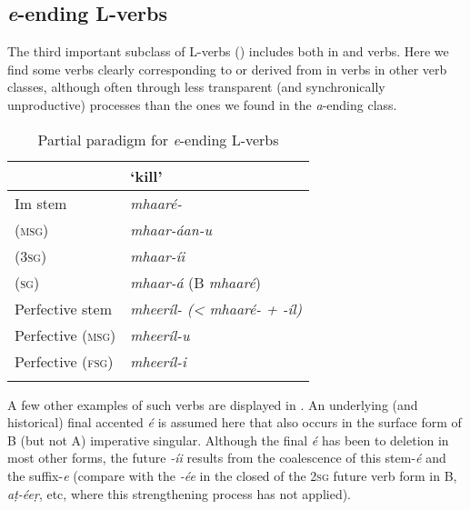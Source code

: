 \subsection{\textit{e}-ending L-verbs}
\label{subsec:8-3-3}


The third important subclass of L-verbs () includes both in and  verbs. Here we find some  verbs clearly corresponding to or derived from in verbs in other verb classes, although often through less transparent (and synchronically unproductive) processes than the ones we found in the \textit{a}-ending class.


\begin{table}[ht]
\caption{Partial paradigm for \textit{e}-ending L-verbs}
\begin{tabularx}{.75\textwidth}{ Q Q }
\lsptoprule
&
`kill'\\\midrule
Im stem &
\textit{mhaaré-}\\
 (\textsc{msg}) &
\textit{mhaar-áan-u} \\
 (\textsc{3sg}) &
\textit{mhaar-íi} \\
 (\textsc{sg}) &
\textit{mhaar-á} (B \textit{mhaaré})\\
Perfective stem &
\textit{mheeríl- ({\textless} mhaaré- + -íl)}\\
Perfective (\textsc{msg}) &
\textit{mheeríl-u} \\
Perfective (\textsc{fsg}) &
\textit{mheeríl-i} \\\lspbottomrule
\end{tabularx}
\label{tab:8-6}
\end{table}


A few other examples of such verbs are displayed in . An underlying (and historical) final accented \textit{é} is assumed here that also occurs in the surface form of B (but not A) imperative singular. Although the final \textit{é} has been  to deletion in most other forms, the future  \textit{-íi} results from the coalescence of this stem-\textit{é} and the suffix-\textit{e} (compare with the \textit{-ée} in the closed  of the \textsc{2sg} future verb form in B, \textit{aṭ-éeṛ}, etc, where this strengthening process has not applied).



